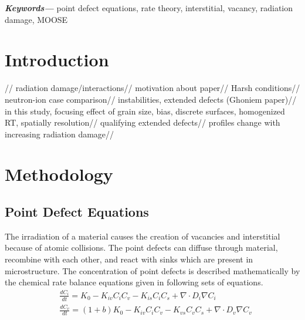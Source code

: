 \documentclass[a4paper]{article}
\providecommand{\keywords}[1]
{
  \small
  \textbf{\textit{Keywords---}} #1
}
\begin{document}
\keywords{point defect equations, rate theory, interstitial, vacancy, radiation damage, MOOSE}

% 


\section{Introduction} \hspace{10pt}
\newpage
//
radiation damage/interactions//
motivation about paper//
Harsh conditions//
neutron-ion case comparison//
instabilities, extended defects (Ghoniem paper)//
in this study, focusing effect of grain size, bias, discrete surfaces,
homogenized RT, spatially resolution//
qualifying extended defects//
profiles change with increasing radiation damage//


\section{Methodology} \hspace{10pt}

\subsection{Point Defect Equations} \hspace{10pt}
The irradiation of a material causes the creation of vacancies and interstitial because of
atomic collisions. The point defects can diffuse through material, recombine with each other,
and react with sinks which are present in microstructure. The concentration of point defects is
described mathematically by the chemical rate balance equations given in following sets of equations.\\

\begin{equation}
  \begin{aligned}
    &\frac{dC_i}{dt} = K_0 - K_{iv}C_iC_v - K_{is}C_iC_s + \nabla\cdot D_i\nabla C_i\\
    &\frac{dC_v}{dt} = (1+b)K_0 - K_{iv}C_iC_v - K_{vs}C_vC_s + \nabla\cdot D_v\nabla C_v\\
  \end{aligned}
  \label{equation:point_defect_equations}
\end{equation}\\
\end{document}

